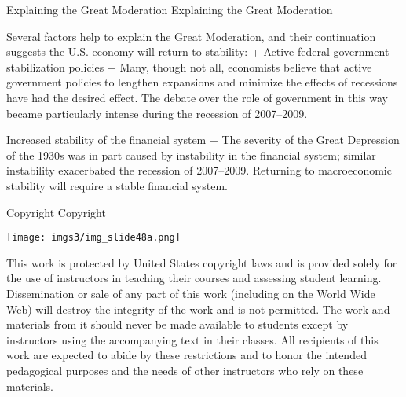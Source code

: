 \documentclass[
  12pt,
  ignorenonframetext,
]{beamer}
\begin{document}
\begin{frame}{Explaining the Great Moderation}
\protect\hypertarget{explaining-the-great-moderation}{}
Explaining the Great Moderation

Several factors help to explain the Great Moderation, and their
continuation suggests the U.S. economy will return to stability: +
Active federal government stabilization policies + Many, though not all,
economists believe that active government policies to lengthen
expansions and minimize the effects of recessions have had the desired
effect. The debate over the role of government in this way became
particularly intense during the recession of 2007--2009.

Increased stability of the financial system + The severity of the Great
Depression of the 1930s was in part caused by instability in the
financial system; similar instability exacerbated the recession of
2007--2009. Returning to macroeconomic stability will require a stable
financial system.
\end{frame}

\begin{frame}{Copyright}
\protect\hypertarget{copyright}{}
Copyright

\texttt{[image: imgs3/img\_slide48a.png]}

This work is protected by United States copyright laws and is provided
solely for the use of instructors in teaching their courses and
assessing student learning. Dissemination or sale of any part of this
work (including on the World Wide Web) will destroy the integrity of the
work and is not permitted. The work and materials from it should never
be made available to students except by instructors using the
accompanying text in their classes. All recipients of this work are
expected to abide by these restrictions and to honor the intended
pedagogical purposes and the needs of other instructors who rely on
these materials.
\end{frame}
\end{document}
